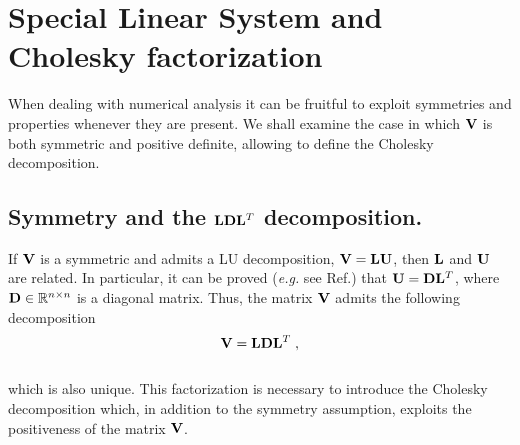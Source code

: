 \section{Special Linear System and Cholesky factorization}
When dealing with numerical analysis it can be fruitful to exploit symmetries and properties whenever they are present. We shall examine the case in which $\mathbf{V}$ is both symmetric and positive definite, allowing to define the Cholesky decomposition.

\subsection*{Symmetry and the $\mathbf{L} \mathbf{D} \mathbf{L}^T$ decomposition.}
If $\mathbf{V}$ is a symmetric and admits a LU decomposition, $\mathbf{V} = \mathbf{L} \mathbf{U}$, then $\mathbf{L}$ and $\mathbf{U}$ are related. In particular, it can be proved (\textit{e.g.} see Ref.\cite{GoluVanl96}) that $\mathbf{U} = \mathbf{D} \mathbf{L}^T$, where $\mathbf{D} \in \mathbb{R}^{n \times n}$ is a diagonal matrix. Thus, the matrix $\mathbf{V}$ admits the following decomposition
\\
\begin{equation*}
    \mathbf{V} = \mathbf{L} \mathbf{D} \mathbf{L}^T \;,
\end{equation*}
\\
which is also unique. This factorization is necessary to introduce the Cholesky decomposition which, in addition to the symmetry assumption, exploits the positiveness of the matrix $\mathbf{V}$.

